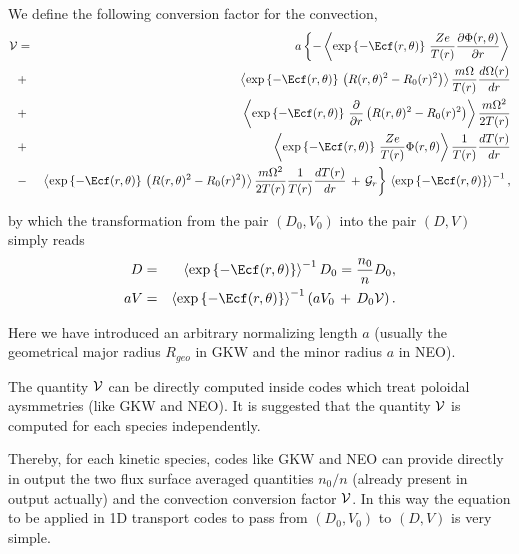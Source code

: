 We define the following conversion factor for the convection,
\begin{eqnarray*}
{\cal V} &=& a \left\{ - \left \langle \expargs \, \frac{Ze}{T(r)} \Pparder \right \rangle \right. \\
& + &  \left \langle \expargs \, \Rsqdiff \right \rangle \frac{m\Omega}{T(r)} \frac{d \Omega(r)}{d r}\\
& + & \left \langle \expargs \, \frac{\partial}{\partial r} \Rsqdiff \right \rangle \frac{m\Omega^2}{2T(r)}\\
& + & \left \langle \expargs \, \frac{Ze}{T(r)} \Phi(r,\theta) \right \rangle
\Tlnder \\
& - & \left. \left \langle \expargs \, \Rsqdiff \right \rangle \frac{m\Omega^2}{2T(r)} \Tlnder 
\,+\, \calGr
\right\} \, \left \langle \expargs \right \rangle^{-1},
\end{eqnarray*}

by which the transformation from the pair $(D_0, V_0)$ into the pair $(D, V)$
simply reads
\begin{eqnarray} 
D &=& \left \langle \expargs \right \rangle^{-1} D_0 = \frac{n_0}{n} D_0, \\
a V &=&  \left \langle \expargs \right \rangle^{-1} \left( a V_0 \,+\,
D_0 \cal{V} \right).
\label{eq.DVtransform}
\end{eqnarray}

Here we have introduced an arbitrary normalizing length $a$
(usually the geometrical major radius $R_{geo}$ in GKW and 
the minor radius $a$ in NEO).

The quantity $\cal{V}$ can be directly computed inside codes
which treat poloidal aysmmetries (like GKW and NEO).
It is suggested that the quantity $\cal{V}$ is computed for
each species independently.

Thereby, for each kinetic species, codes like GKW and NEO 
can provide directly in output the two flux surface averaged 
quantities $n_0 / n$ (already present in output actually)
and the convection conversion factor $\cal{V}$.
In this way the equation to be applied in 1D 
transport codes to pass from $(D_0, V_0)$ to $(D, V)$ is
very simple.

